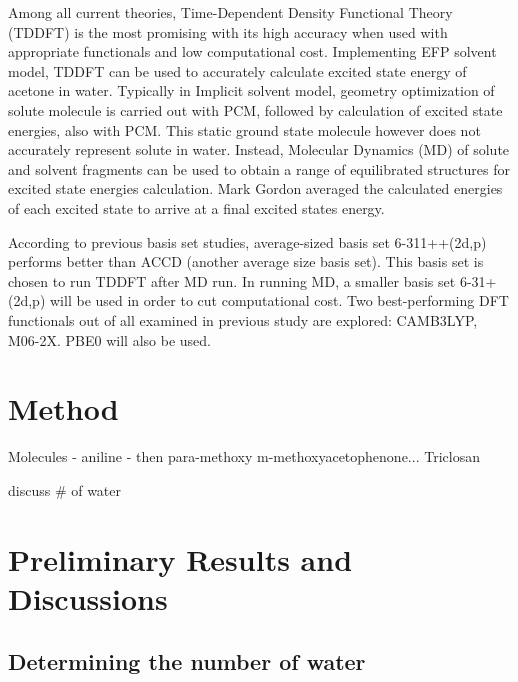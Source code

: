 \documentclass[
journal=jacsat, %
manuscript=article]{achemso}
\begin{document}
Among all current theories, Time-Dependent Density Functional Theory (TDDFT) is the most promising with its high accuracy when used with appropriate functionals and low computational cost\cite{Magyar2007}. Implementing EFP solvent model, TDDFT can be used to accurately calculate excited state energy of acetone in water.\cite{Yoo2008} Typically in Implicit solvent model, geometry optimization of solute molecule is carried out with PCM, followed by calculation of excited state energies, also with PCM. This static ground state molecule however does not accurately represent solute in water. Instead, Molecular Dynamics (MD) of solute and solvent fragments can be used to obtain a range of equilibrated structures for excited state energies calculation. Mark Gordon averaged the calculated energies of each excited state to arrive at a final excited states energy.\cite{Defusco2011}

According to previous basis set studies, average-sized basis set 6-311++(2d,p) performs better than ACCD (another average size basis set).\cite{Wiberg2004,Barnes2014} This basis set is chosen to run TDDFT after MD run. In running MD, a smaller basis set 6-31+(2d,p) will be used in order to cut computational cost. Two best-performing DFT functionals out of all examined in previous study are explored: CAMB3LYP, M06-2X.\cite{Barnes2014} PBE0 will also be used.

\section{Method}

Molecules - aniline - then para-methoxy m-methoxyacetophenone... Triclosan

discuss \# of water



\section{Preliminary Results and Discussions}

\subsection{Determining the number of water}
\end{document}
